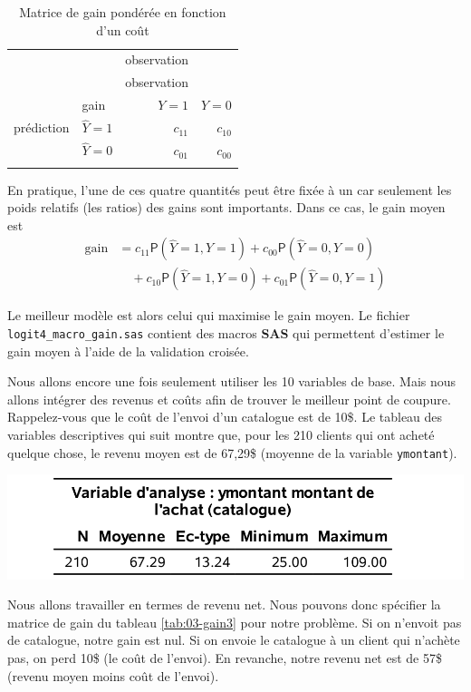 \documentclass[
  11pt,
  letterpaper,
]{book}
\theoremstyle{definition}
\theoremstyle{definition}
\theoremstyle{definition}
\theoremstyle{remark}
\begin{document}
\begin{longtable}[]{@{}llrr@{}}
\caption{\label{tab:03-gain2} Matrice de gain pondérée en fonction d'un coût}\tabularnewline
\toprule
& & observation & \\ \addlinespace
\midrule
\endfirsthead
\toprule
& & observation & \\ \addlinespace
\midrule
\endhead
& gain & \(Y=1\) & \(Y=0\) \\ \addlinespace
prédiction & \(\widehat{Y}=1\) & \(c_{11}\) & \(c_{10}\) \\ \addlinespace
& \(\widehat{Y}=0\) & \(c_{01}\) & \(c_{00}\) \\ \addlinespace
\bottomrule
\end{longtable}

En pratique, l'une de ces quatre quantités peut être fixée à un car seulement les poids relatifs (les ratios) des gains sont importants. Dans ce cas, le gain moyen est
\begin{align*}
\text{gain} &= c_{11} {\mathsf P}\left(\widehat{Y}=1, Y=1\right) + c_{00}{\mathsf P}\left(\widehat{Y}=0, Y=0\right) 
\\ &\quad + c_{10} {\mathsf P}\left(\widehat{Y}=1, Y=0\right)  + c_{01} {\mathsf P}\left(\widehat{Y}=0, Y=1\right)
\end{align*}

Le meilleur modèle est alors celui qui maximise le gain moyen. Le fichier \texttt{logit4\_macro\_gain.sas} contient des macros \textbf{SAS} qui permettent d'estimer le gain moyen à l'aide de la validation croisée.

Nous allons encore une fois seulement utiliser les 10 variables de base. Mais nous allons intégrer des revenus et coûts afin de trouver le meilleur point de coupure. Rappelez-vous que le coût de l'envoi d'un catalogue est de 10\$. Le tableau des variables descriptives qui suit montre que, pour les 210 clients qui ont acheté quelque chose, le revenu moyen est de 67,29\$ (moyenne de la variable \texttt{ymontant}).

\begin{center}\includegraphics[width=0.6\linewidth]{figures/03-logistic-e18} \end{center}

Nous allons travailler en termes de revenu net. Nous pouvons donc spécifier la matrice de gain du tableau \ref{tab:03-gain3} pour notre problème. Si on n'envoit pas de catalogue, notre gain est nul. Si on envoie le catalogue à un client qui n'achète pas, on perd 10\$ (le coût de l'envoi). En revanche, notre revenu net est de 57\$ (revenu moyen moins coût de l'envoi).
\end{document}
